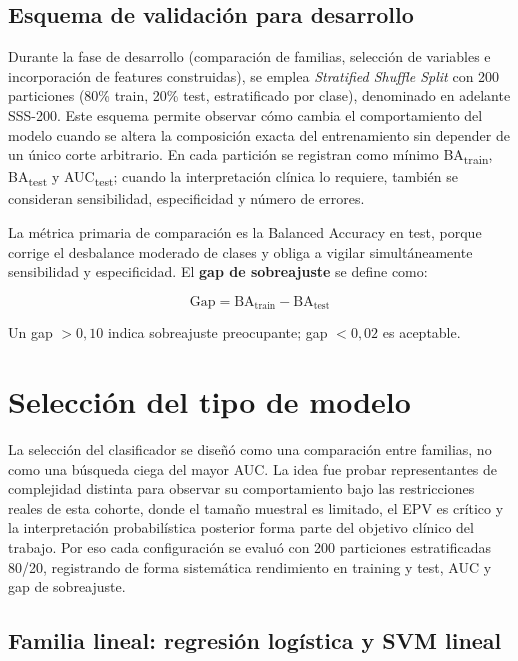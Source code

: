 \subsection{Esquema de validación para desarrollo}

Durante la fase de desarrollo (comparación de familias, selección de variables e incorporación de features construidas), se emplea \textit{Stratified Shuffle Split} con 200 particiones (80\% train, 20\% test, estratificado por clase), denominado en adelante SSS-200. Este esquema permite observar cómo cambia el comportamiento del modelo cuando se altera la composición exacta del entrenamiento sin depender de un único corte arbitrario. En cada partición se registran como mínimo BA\textsubscript{train}, BA\textsubscript{test} y AUC\textsubscript{test}; cuando la interpretación clínica lo requiere, también se consideran sensibilidad, especificidad y número de errores.

La métrica primaria de comparación es la Balanced Accuracy en test, porque corrige el desbalance moderado de clases y obliga a vigilar simultáneamente sensibilidad y especificidad. El \textbf{gap de sobreajuste} se define como:

\begin{equation}
\text{Gap} = \text{BA}_{\text{train}} - \text{BA}_{\text{test}}
\end{equation}

Un gap $> 0{,}10$ indica sobreajuste preocupante; gap $< 0{,}02$ es aceptable.

\section{Selección del tipo de modelo}\label{sec:seleccion_modelo}

La selección del clasificador se diseñó como una comparación entre familias, no como una búsqueda ciega del mayor AUC.
La idea fue probar representantes de complejidad distinta para observar su comportamiento bajo las restricciones reales
de esta cohorte, donde el tamaño muestral es limitado, el EPV es crítico y la interpretación probabilística posterior
forma parte del objetivo clínico del trabajo. Por eso cada configuración se evaluó con 200 particiones estratificadas
80/20, registrando de forma sistemática rendimiento en training y test, AUC y gap de sobreajuste.

\subsection{Familia lineal: regresión logística y SVM lineal}

